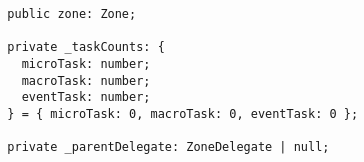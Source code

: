\begin{verbatim}
  public zone: Zone;

  private _taskCounts: {
    microTask: number;
    macroTask: number;
    eventTask: number;
  } = { microTask: 0, macroTask: 0, eventTask: 0 };

  private _parentDelegate: ZoneDelegate | null;
\end{verbatim}
